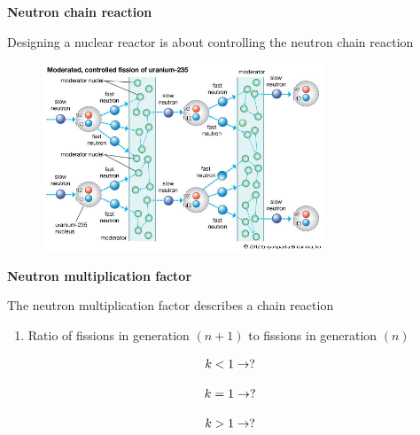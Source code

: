 \documentclass[aspectratio=1610,pdftex,dvipsnames,compress,xcolor={dvipsnames}]{beamer}
\begin{document}
\begin{frame}[plain]{}
    \centering\LARGE\textbf{Neutron chain reaction}
\end{frame}


\addtocounter{framenumber}{-1} 
\begin{frame}{Designing a nuclear reactor is about controlling the neutron chain reaction}
    \begin{figure}
        \centering
        \includegraphics[width=0.75\textwidth]{fission.jpg}
    \end{figure}
\end{frame}


\begin{frame}[plain]{}
    \centering\LARGE\textbf{Neutron multiplication factor}
\end{frame}


\addtocounter{framenumber}{-1} 
\begin{frame}{The neutron multiplication factor describes a chain reaction}
    \begin{enumerate}[series=outerlist,topsep=0pt,itemsep=21pt,leftmargin=*,label=(\arabic*)]
        \item[]Ratio of fissions in generation $(n+1)$ to fissions in generation $(n)$
    \end{enumerate}

    \vspace*{\fill}

    \begin{equation}
        \LARGE
        k < 1 \rightarrow ?
    \end{equation}

    \begin{equation}
        \LARGE
        k = 1 \rightarrow ?
    \end{equation}

    \begin{equation}
        \LARGE
        k > 1 \rightarrow ?
    \end{equation}
\end{frame}
\end{document}
